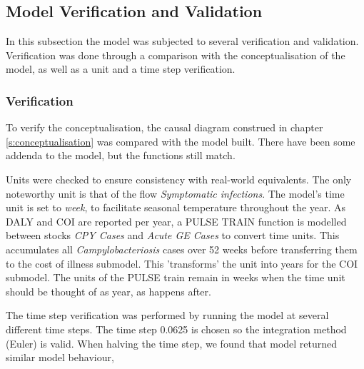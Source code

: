 \subsection{Model Verification and Validation}
In this subsection the model was subjected to several verification and validation. Verification was done through a comparison with the conceptualisation of the model, as well as a unit and a time step verification. 

\subsubsection{Verification}
\label{s:verification}

    
To verify the conceptualisation, the causal diagram construed in chapter \ref{s:conceptualisation} was compared with the model built. There have been some addenda to the model, but the functions still match.  
    
Units were checked to ensure consistency with real-world equivalents. The only noteworthy unit is that of the flow \textit{Symptomatic infections}. The model's time unit is set to \textit{week}, to facilitate seasonal temperature throughout the year. As DALY and COI are reported per year, a PULSE TRAIN function is modelled between stocks \textit{CPY Cases} and \textit{Acute GE Cases} to convert time units. This accumulates all \textit{Campylobacteriosis} cases over 52 weeks before transferring them to the cost of illness submodel. This 'transforms' the unit into years for the COI submodel. The units of the PULSE train remain in weeks when the time unit should be thought of as year, as happens after. 
    
The time step verification was performed by running the model at several different time steps. The time step 0.0625 is chosen so the integration method (Euler) is valid. When halving the time step, we found that model returned similar model behaviour, 

